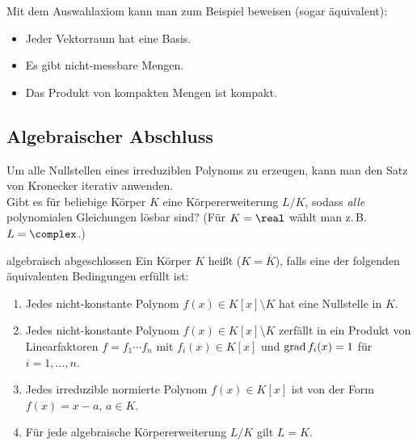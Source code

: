 \begin{Bsp}
    Mit dem Auswahlaxiom kann man zum Beispiel beweisen
    (sogar äquivalent):
    \begin{itemize}
        \item
        Jeder Vektorraum hat eine Basis.

        \item
        Es gibt nicht-messbare Mengen.

        \item
        Das Produkt von kompakten Mengen ist kompakt.
    \end{itemize}
\end{Bsp}

\pagebreak

\subsection{%
    Algebraischer Abschluss%
}

\begin{Bem}
    Um alle Nullstellen eines irreduziblen Polynoms zu erzeugen, kann
    man den Satz von Kronecker iterativ anwenden.\\
    Gibt es für beliebige Körper $K$ eine Körpererweiterung $L/K$, sodass
    \emph{alle} polynomialen Gleichungen lösbar sind?
    (Für $K = \real$ wählt man z.\,B. $L = \complex$.)
\end{Bem}

\begin{Def}{algebraisch abgeschlossen}
    Ein Körper $K$ heißt 
    ($K = \overline{K}$), falls eine der folgenden äquivalenten
    Bedingungen erfüllt ist:
    \begin{enumerate}[label=(\alph*)]
        \item
        Jedes nicht-konstante Polynom $f(x) \in K[x] \setminus K$ hat eine
        Nullstelle in $K$.

        \item
        Jedes nicht-konstante Polynom $f(x) \in K[x] \setminus K$ zerfällt in
        ein Produkt von Linearfaktoren $f = f_1 \dotsm f_n$ mit
        $f_i(x) \in K[x]$ und $\operatorname{grad} f_i(x) = 1$ für $i = 1, \dotsc, n$.

        \item
        Jedes irreduzible normierte Polynom $f(x) \in K[x]$ ist von der Form
        $f(x) = x - a$, $a \in K$.

        \item
        Für jede algebraische Körpererweiterung $L/K$ gilt $L = K$.
    \end{enumerate}
\end{Def}

